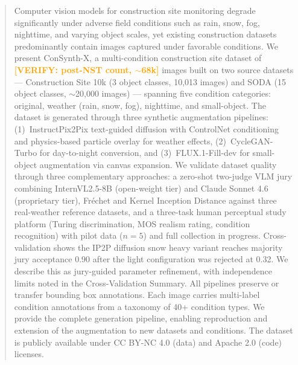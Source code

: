\documentclass[12pt]{article}
\newcommand{\verify}[1]{\textcolor{orange}{\textbf{[VERIFY: #1]}}}
\begin{document}
\begin{abstract}

Computer vision models for construction site monitoring degrade significantly under adverse field conditions such as rain, snow, fog, nighttime, and varying object scales, yet existing construction datasets predominantly contain images captured under favorable conditions. We present ConSynth-X, a multi-condition construction site dataset of \verify{post-NST count, $\sim$68k} images built on two source datasets --- Construction Site 10k (3 object classes, 10,013 images) and SODA (15 object classes, $\sim$20,000 images) --- spanning five condition categories: original, weather (rain, snow, fog), nighttime, and small-object. The dataset is generated through three synthetic augmentation pipelines: (1)~InstructPix2Pix text-guided diffusion with ControlNet conditioning and physics-based particle overlay for weather effects, (2)~CycleGAN-Turbo for day-to-night conversion, and (3)~FLUX.1-Fill-dev for small-object augmentation via canvas expansion. We validate dataset quality through three complementary approaches: a zero-shot two-judge VLM jury combining InternVL2.5-8B (open-weight tier) and Claude Sonnet 4.6 (proprietary tier), Fr\'{e}chet and Kernel Inception Distance against three real-weather reference datasets, and a three-task human perceptual study platform (Turing discrimination, MOS realism rating, condition recognition) with pilot data ($n{=}5$) and full collection in progress. Cross-validation shows the IP2P diffusion snow heavy variant reaches majority jury acceptance 0.90 after the light configuration was rejected at 0.32. We describe this as jury-guided parameter refinement, with independence limits noted in the Cross-Validation Summary. All pipelines preserve or transfer bounding box annotations. Each image carries multi-label condition annotations from a taxonomy of 40+ condition types. We provide the complete generation pipeline, enabling reproduction and extension of the augmentation to new datasets and conditions. The dataset is publicly available under CC BY-NC 4.0 (data) and Apache 2.0 (code) licenses.

\end{abstract}

\end{document}
